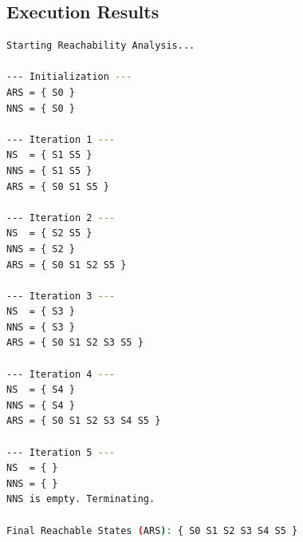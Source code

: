 \documentclass[12pt,a4paper]{article}
\begin{document}
\subsection{Execution Results}



\begin{lstlisting}[language=bash]
Starting Reachability Analysis...

--- Initialization ---
ARS = { S0 }
NNS = { S0 }

--- Iteration 1 ---
NS  = { S1 S5 }
NNS = { S1 S5 }
ARS = { S0 S1 S5 }

--- Iteration 2 ---
NS  = { S2 S5 }
NNS = { S2 }
ARS = { S0 S1 S2 S5 }

--- Iteration 3 ---
NS  = { S3 }
NNS = { S3 }
ARS = { S0 S1 S2 S3 S5 }

--- Iteration 4 ---
NS  = { S4 }
NNS = { S4 }
ARS = { S0 S1 S2 S3 S4 S5 }

--- Iteration 5 ---
NS  = { }
NNS = { }
NNS is empty. Terminating.

Final Reachable States (ARS): { S0 S1 S2 S3 S4 S5 }
\end{lstlisting}
\end{document}
